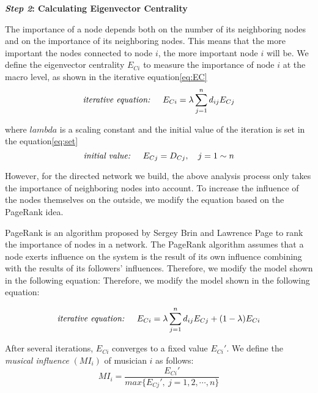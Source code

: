 \documentclass[12pt]{article}  %
\newenvironment{shrinkeq}[1]
{ \bgroup
	\addtolength\abovedisplayshortskip{#1}
	\addtolength\abovedisplayskip{#1}
	\addtolength\belowdisplayshortskip{#1}
	\addtolength\belowdisplayskip{#1}}
{\egroup\ignorespacesafterend}
\begin{document}
\textbf{\emph{Step 2}: Calculating Eigenvector Centrality}

The importance of a node depends both on the number of its neighboring nodes and on the importance of its neighboring nodes. This means that the more important the nodes connected to node $i$, the more important node $i$ will be. We define the eigenvector centrality $E_{Ci}$ to measure the importance of node $i$ at the macro level, as shown in the iterative equation\eqref{eq:EC}
\begin{shrinkeq}{-1.5ex}
	\begin{equation}\label{eq:EC}
    \mbox{\emph{iterative equation:} \ \ \ }	E_{Ci}=\lambda\sum\limits_{j=1}^{n}d_{ij}E_{Cj}
	\end{equation}
\end{shrinkeq}

where $lambda$ is a scaling constant and the initial value of the iteration is set in the equation\eqref{eq:set}
\begin{shrinkeq}{-1.5ex}
	\begin{equation}\label{eq:set}
	\mbox{\emph{initial value:} \ \ \ }E_{Cj}=D_{Cj},\ \ \ j=1\sim n
	\end{equation}
\end{shrinkeq}

However, for the directed network we build, the above analysis process only takes the importance of neighboring nodes into account. To increase the influence of the nodes themselves on the outside, we modify the equation based on the PageRank idea.

PageRank\cite{2} is an algorithm proposed by Sergey Brin and Lawrence Page to rank the importance of nodes in a network. The PageRank algorithm assumes that a node exerts influence on the system is the result of its own influence combining with the results of its followers' influences. Therefore, we modify the model shown in the following equation: Therefore, we modify the model shown in the following equation:

\begin{shrinkeq}{-1.5ex}
	\begin{equation}
    \mbox{\emph{iterative equation:} \ \ \ }	E_{Ci}=\lambda\sum\limits_{j=1}^{n}d_{ij}E_{Cj}+(1-\lambda)E_{Ci}
	\end{equation}
\end{shrinkeq}

After several iterations, $E_{Ci}$ converges to a fixed value $E_{Ci}'$. We define the \emph{musical influence} $(MI_i)$ of musician $i$ as follows:
\begin{shrinkeq}{-1.5ex}
	\begin{equation}
	MI_i=\frac{E_{Ci}'}{max\{E_{Cj}',\ j=1,2,\cdots,n \}}
	\end{equation}
\end{shrinkeq}
\vspace{-0.7cm}
\end{document}
